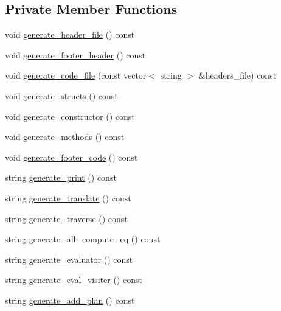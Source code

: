 \subsection*{Private Member Functions}
\begin{DoxyCompactItemize}
\item 
void \hyperlink{classgenevalmag_1_1Builder__code_a62d38d96676f0a11a377c19991bf4e90}{generate\_\-header\_\-file} () const 
\item 
void \hyperlink{classgenevalmag_1_1Builder__code_a5f3ad7619822680e0f2a79d7c26af776}{generate\_\-footer\_\-header} () const 
\item 
void \hyperlink{classgenevalmag_1_1Builder__code_a67439b5f2c7cd855e17a0fb91317a1d2}{generate\_\-code\_\-file} (const vector$<$ string $>$ \&headers\_\-file) const 
\item 
void \hyperlink{classgenevalmag_1_1Builder__code_a5dcd144389b5612a328fede4317d414f}{generate\_\-structs} () const 
\item 
void \hyperlink{classgenevalmag_1_1Builder__code_ac390149dae2358dda72ff8360f30c693}{generate\_\-constructor} () const 
\item 
void \hyperlink{classgenevalmag_1_1Builder__code_a81b67543752446840e23c8b8fd3b9e7a}{generate\_\-methods} () const 
\item 
void \hyperlink{classgenevalmag_1_1Builder__code_af334d372096a958000bd0b53360223ab}{generate\_\-footer\_\-code} () const 
\item 
string \hyperlink{classgenevalmag_1_1Builder__code_ad88294497280bb904ff3269b00446bc8}{generate\_\-print} () const 
\item 
string \hyperlink{classgenevalmag_1_1Builder__code_ab8a711e35ef2a06238854398ce9ed0e6}{generate\_\-translate} () const 
\item 
string \hyperlink{classgenevalmag_1_1Builder__code_a1b3412a660f7d69345932171709cf6d6}{generate\_\-traverse} () const 
\item 
string \hyperlink{classgenevalmag_1_1Builder__code_a8052b85fae1b226af5fb65c2d548f432}{generate\_\-all\_\-compute\_\-eq} () const 
\item 
string \hyperlink{classgenevalmag_1_1Builder__code_aab8e30a2b842ad236a2bd70149839004}{generate\_\-evaluator} () const 
\item 
string \hyperlink{classgenevalmag_1_1Builder__code_ad40103cc1f4217fdba2924ed1e29efdc}{generate\_\-eval\_\-visiter} () const 
\item 
string \hyperlink{classgenevalmag_1_1Builder__code_af62cdc4b1ad2302cd368e1b3c4fb99d9}{generate\_\-add\_\-plan} () const 

\end{DoxyCompactItemize}
